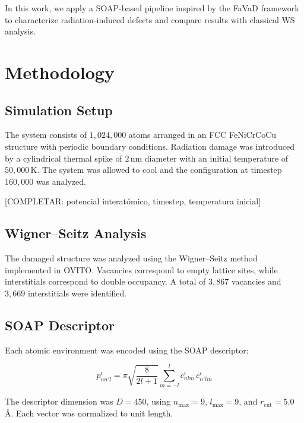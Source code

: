 \documentclass[11pt]{article}
\begin{document}
In this work, we apply a SOAP-based pipeline inspired by the FaVaD framework
to characterize radiation-induced defects and compare results with classical WS
analysis.

\section{Methodology}

\subsection{Simulation Setup}

The system consists of $1{,}024{,}000$ atoms arranged in an FCC FeNiCrCoCu
structure with periodic boundary conditions. Radiation damage was introduced
by a cylindrical thermal spike of $2$\,nm diameter with an initial temperature
of $50{,}000$\,K. The system was allowed to cool and the configuration at
timestep $160{,}000$ was analyzed.

[COMPLETAR: potencial interatómico, timestep, temperatura inicial]

\subsection{Wigner--Seitz Analysis}

The damaged structure was analyzed using the Wigner--Seitz method implemented
in OVITO. Vacancies correspond to empty lattice sites, while interstitials
correspond to double occupancy. A total of $3{,}867$ vacancies and $3{,}669$
interstitials were identified.

\subsection{SOAP Descriptor}

Each atomic environment was encoded using the SOAP descriptor:

\begin{equation}
p^i_{nn'l} = \pi\sqrt{\frac{8}{2l+1}} \sum_{m=-l}^{l} c^i_{nlm}\,c^i_{n'lm}
\label{eq:soap}
\end{equation}

The descriptor dimension was $D = 450$, using $n_{\max} = 9$,
$l_{\max} = 9$, and $r_{\mathrm{cut}} = 5.0$\,\AA. Each vector was normalized
to unit length.
\end{document}
